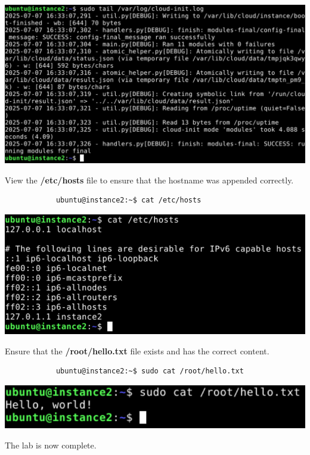 \documentclass[letterpaper, 12pt]{article}
\begin{document}
\begin{enumerate}
\begin{labstep}
        \begin{center}
            \includegraphics[width=\linewidth]{images/part3/step11.png}
        \end{center}
    \end{labstep}

    \begin{labstep}
        View the \textbf{/etc/hosts} file to ensure that the hostname was appended correctly.
        \begin{lstlisting}
            ubuntu@instance2:~$ cat /etc/hosts
        \end{lstlisting}

        \begin{center}
            \includegraphics[width=\linewidth]{images/part3/step12.png}
        \end{center}
    \end{labstep}

    \begin{labstep}
        Ensure that the \textbf{/root/hello.txt} file exists and has the correct content.
        \begin{lstlisting}
            ubuntu@instance2:~$ sudo cat /root/hello.txt
        \end{lstlisting}

        \begin{center}
            \includegraphics[width=\linewidth]{images/part3/step13.png}
        \end{center}
    \end{labstep}

    \begin{labstep}
        The lab is now complete.
    \end{labstep}

\end{enumerate}
\end{document}
